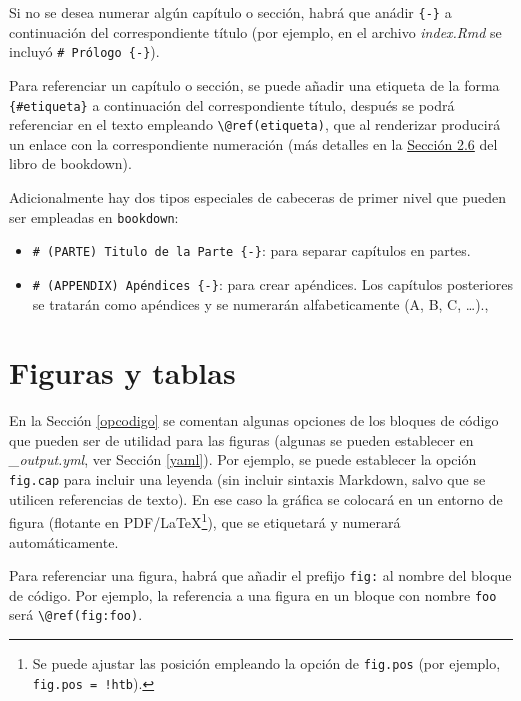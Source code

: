 \documentclass[]{book}
\let\rmarkdownfootnote\footnote%
\def\footnote{\protect\rmarkdownfootnote}
\theoremstyle{definition}
\theoremstyle{definition}
\theoremstyle{definition}
\theoremstyle{remark}
\begin{document}
Si no se desea numerar algún capítulo o sección, habrá que anádir
\texttt{\{-\}} a continuación del correspondiente título (por ejemplo,
en el archivo \emph{index.Rmd} se incluyó \texttt{\#\ Prólogo\ \{-\}}).

Para referenciar un capítulo o sección, se puede añadir una etiqueta de
la forma \texttt{\{\#etiqueta\}} a continuación del correspondiente
título, después se podrá referenciar en el texto empleando
\texttt{\textbackslash{}@ref(etiqueta)}, que al renderizar producirá un
enlace con la correspondiente numeración (más detalles en la
\href{https://bookdown.org/yihui/bookdown/cross-references.html}{Sección
2.6} del libro de bookdown).

Adicionalmente hay dos tipos especiales de cabeceras de primer nivel que
pueden ser empleadas en \texttt{bookdown}:

\begin{itemize}
\item
  \texttt{\#\ (PARTE)\ Titulo\ de\ la\ Parte\ \{-\}}: para separar
  capítulos en partes.
\item
  \texttt{\#\ (APPENDIX)\ Apéndices\ \{-\}}: para crear apéndices. Los
  capítulos posteriores se tratarán como apéndices y se numerarán
  alfabeticamente (A, B, C, \ldots{}).,
\end{itemize}

\section{Figuras y tablas}\label{figuras-y-tablas}

En la Sección \ref{opcodigo} se comentan algunas opciones de los bloques
de código que pueden ser de utilidad para las figuras (algunas se pueden
establecer en \emph{\_output.yml}, ver Sección \ref{yaml}). Por ejemplo,
se puede establecer la opción \texttt{fig.cap} para incluir una leyenda
(sin incluir sintaxis Markdown, salvo que se utilicen referencias de
texto). En ese caso la gráfica se colocará en un entorno de figura
(flotante en PDF/LaTeX\footnote{Se puede ajustar las posición empleando
  la opción de \texttt{fig.pos} (por ejemplo,
  \texttt{fig.pos\ =\ \textquotesingle{}!htb\textquotesingle{}}).}), que
se etiquetará y numerará automáticamente.

Para referenciar una figura, habrá que añadir el prefijo \texttt{fig:}
al nombre del bloque de código. Por ejemplo, la referencia a una figura
en un bloque con nombre \texttt{foo} será
\texttt{\textbackslash{}@ref(fig:foo)}.
\end{document}
